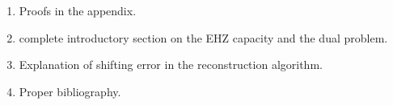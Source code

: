 \documentclass[../capacities_main.tex]{subfiles}
\begin{document}
	
	
	\begin{enumerate}
		\item Proofs in the appendix.
		\item complete introductory section on the EHZ capacity and the dual problem.
		\item Explanation of shifting error in the reconstruction algorithm. 
		\item Proper bibliography.
	\end{enumerate}
	
\end{document}
